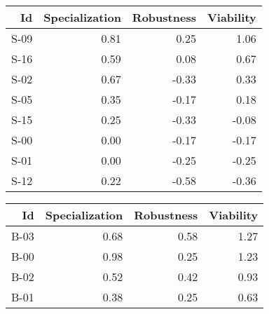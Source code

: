 


\begin{tabular}{ | r | r | r | r | }
    \hline
                    Id  &  Specialization  &      Robustness  &       Viability  \\
    \hline
    \hline
                  S-09  &            0.81  &            0.25  &            1.06  \\
    \hline
                  S-16  &            0.59  &            0.08  &            0.67  \\
    \hline
                  S-02  &            0.67  &           -0.33  &            0.33  \\
    \hline
                  S-05  &            0.35  &           -0.17  &            0.18  \\
    \hline
                  S-15  &            0.25  &           -0.33  &           -0.08  \\
    \hline
                  S-00  &            0.00  &           -0.17  &           -0.17  \\
    \hline
                  S-01  &            0.00  &           -0.25  &           -0.25  \\
    \hline
                  S-12  &            0.22  &           -0.58  &           -0.36  \\
    \hline
\end{tabular}


\begin{tabular}{ | r | r | r | r | }
    \hline
                    Id  &  Specialization  &      Robustness  &       Viability  \\
    \hline
    \hline
                  B-03  &            0.68  &            0.58  &            1.27  \\
    \hline
                  B-00  &            0.98  &            0.25  &            1.23  \\
    \hline
                  B-02  &            0.52  &            0.42  &            0.93  \\
    \hline
                  B-01  &            0.38  &            0.25  &            0.63  \\
    \hline
\end{tabular}


